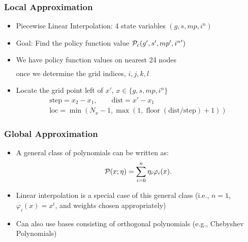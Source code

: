 \documentclass[11pt]{beamer}
\begin{document}

\begin{frame}\frametitle{Local Approximation}

\begin{itemize}\setlength{\itemsep}{8pt}
  \item <1-|handout:1>Piecewise Linear Interpolation: 4 state variables $(g,s,mp,i^n)$
  \item <2-|handout:1>Goal: Find the policy function value ${\cal{P}}_c(g',s',mp',{i^n}')$
  \item <3-|handout:1>We have policy function values on nearest 24 nodes
  \begin{gather*}
   [{\cal{P}}_c(g_i,s_j,mp_k,i^n_l), {\cal{P}}_c(g_i,s_j,mp_k,i^n_{l+1}), {\cal{P}}_c(g_i,s_j,mp_{k+1},i^n_l), \\ \dots, {\cal{P}}_c(g_{i+1},s_{j+1},mp_{k+1},i^n_{l+1})]
  \end{gather*}
  once we determine the grid indices, $i,j,k,l$
\item   <4-|handout:1>Locate the grid point left of $x'$, $x \in \{g,s,mp,i^n\}$ %
   \begin{gather*}
    \textrm{step} = x_2 - x_1, \qquad \textrm{dist} = x' - x_1\\
    \textrm{loc} = \min(N_x-1,\max(1,\operatorname{floor}(\textrm{dist}/\textrm{step}) + 1))
    \end{gather*}
\end{itemize}

\end{frame}


\begin{frame}\frametitle{Global Approximation}

\begin{itemize}\setlength{\itemsep}{10pt}
  \item <1-|handout:1>A general class of polynomials can be written as:
  \begin{gather*}
  {\cal{P}}(x;\eta) = \sum_{i=0}^n\eta_i\varphi_i(x).
  \end{gather*}
  \item <2-|handout:1>Linear interpolation is a special case of this general class (i.e., $n=1$, $\varphi_i(x)=x^i$, and weights chosen appropriately)
  \item <3-|handout:1>Can also use bases consisting of orthogonal polynomials (e.g., Chebyshev Polynomials)
\end{itemize}

\end{frame}
\end{document}
